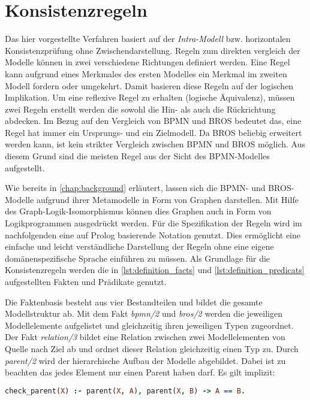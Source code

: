 \section{Konsistenzregeln} \label{sec:Konsistenzregeln}

Das hier vorgestellte Verfahren basiert auf der \emph{Intra-Modell} bzw. horizontalen Konsistenzprüfung ohne Zwischendarstellung.
Regeln zum direkten vergleich der Modelle können in zwei verschiedene Richtungen definiert werden.
Eine Regel kann aufgrund eines Merkmales des ersten Modelles ein Merkmal im zweiten Modell fordern oder umgekehrt.
Damit basieren diese Regeln auf der logischen Implikation.
Um eine reflexive Regel zu erhalten (logische Äquivalenz), müssen zwei Regeln erstellt werden die sowohl die Hin- als auch die Rückrichtung abdecken.
Im Bezug auf den Vergleich von BPMN und BROS bedeutet das, eine Regel hat immer ein Ursprungs- und ein Zielmodell.
Da BROS beliebig erweitert werden kann, ist kein strikter Vergleich zwischen BPMN und BROS möglich.
Aus diesem Grund sind die meisten Regel aus der Sicht des BPMN-Modelles aufgestellt.

Wie bereits in \cref{chap:background} erläutert, lassen sich die BPMN- und BROS-Modelle aufgrund ihrer Metamodelle in Form von Graphen darstellen.
Mit Hilfe des Graph-Logik-Isomorphismus können dies Graphen auch in Form von Logikprogrammen ausgedrückt werden.
Für die Spezifikation der Regeln wird im nachfolgenden eine auf Prolog basierende Notation genutzt.
Dies ermöglicht eine einfache und leicht verständliche Darstellung der Regeln ohne eine eigene domänenspezifische Sprache einführen zu müssen.
Als Grundlage für die Konsistenzregeln werden die in \cref{lst:definition_facts} und \cref{lst:definition_predicats} aufgestellten Fakten und Prädikate genutzt.

Die Faktenbasis besteht aus vier Bestandteilen und bildet die gesamte Modellstruktur ab.
Mit dem Fakt \emph{bpmn/2} und \emph{bros/2} werden die jeweiligen Modellelemente aufgelistet und gleichzeitig ihren jeweiligen Typen zugeordnet.
Der Fakt \emph{relation/3} bildet eine Relation zwischen zwei Modellelementen von Quelle nach Ziel ab und ordnet dieser Relation gleichzeitig einen Typ zu.
Durch \emph{parent/2} wird der hierarchische Aufbau der Modelle abgebildet.
Dabei ist zu beachten das jedes Element nur einen Parent haben darf.
Es gilt implizit:

\begin{lstlisting}[language=Prolog,frame=none]
check_parent(X) :- parent(X, A), parent(X, B) -> A == B.
\end{lstlisting}
\pagebreak
    
